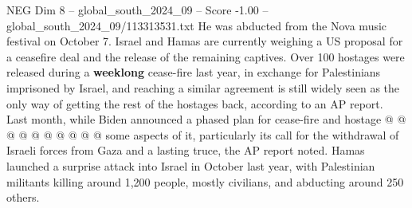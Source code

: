 \begin{textsample}{NEG Dim 8 – global\_south\_2024\_09 – Score -1.00 – global\_south\_2024\_09/113313531.txt}
He was abducted from the Nova music festival on October 7.
Israel and Hamas are currently weighing a US proposal for a ceasefire deal and the release of the remaining captives.
Over 100 hostages were released during a \textbf{weeklong} cease-fire last year, in exchange for Palestinians imprisoned by Israel, and reaching a similar agreement is still widely seen as the only way of getting the rest of the hostages back, according to an AP report.
Last month, while Biden announced a phased plan for cease-fire and hostage @ @ @ @ @ @ @ @ @ @ some aspects of it, particularly its call for the withdrawal of Israeli forces from Gaza and a lasting truce, the AP report noted.
Hamas launched a surprise attack into Israel in October last year, with Palestinian militants killing around 1,200 people, mostly civilians, and abducting around 250 others.

\end{textsample}

